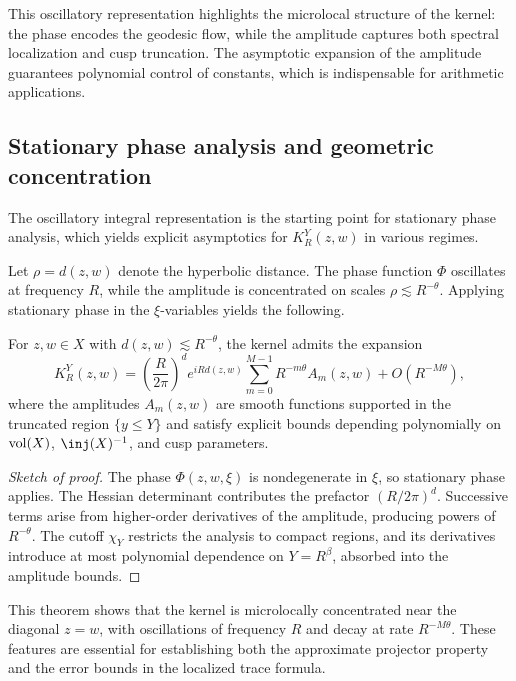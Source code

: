 This oscillatory representation highlights the microlocal structure of the kernel: the phase encodes the geodesic flow, while the amplitude captures both spectral localization and cusp truncation. The asymptotic expansion of the amplitude guarantees polynomial control of constants, which is indispensable for arithmetic applications.

\subsection{Stationary phase analysis and geometric concentration}\label{subsec:micro-stationary}

The oscillatory integral representation is the starting point for stationary phase analysis, which yields explicit asymptotics for $K_R^Y(z,w)$ in various regimes.

Let $\rho = d(z,w)$ denote the hyperbolic distance. The phase function $\Phi$ oscillates at frequency $R$, while the amplitude is concentrated on scales $\rho \lesssim R^{-\theta}$. Applying stationary phase in the $\xi$-variables yields the following.

\begin{theorem}\label{thm:stationary-phase}
For $z,w \in X$ with $d(z,w) \lesssim R^{-\theta}$, the kernel admits the expansion
\[
K_R^Y(z,w) = \left(\frac{R}{2\pi}\right)^d e^{iR d(z,w)} \sum_{m=0}^{M-1} R^{-m\theta} A_m(z,w) + O(R^{-M\theta}),
\]
where the amplitudes $A_m(z,w)$ are smooth functions supported in the truncated region $\{y \leq Y\}$ and satisfy explicit bounds depending polynomially on $\operatorname{vol}(X)$, $\inj(X)^{-1}$, and cusp parameters.
\end{theorem}

\begin{proof}[Sketch of proof]
The phase $\Phi(z,w,\xi)$ is nondegenerate in $\xi$, so stationary phase applies. The Hessian determinant contributes the prefactor $(R/2\pi)^d$. Successive terms arise from higher-order derivatives of the amplitude, producing powers of $R^{-\theta}$. The cutoff $\chi_Y$ restricts the analysis to compact regions, and its derivatives introduce at most polynomial dependence on $Y=R^\beta$, absorbed into the amplitude bounds.
\end{proof}

This theorem shows that the kernel is microlocally concentrated near the diagonal $z=w$, with oscillations of frequency $R$ and decay at rate $R^{-M\theta}$. These features are essential for establishing both the approximate projector property and the error bounds in the localized trace formula.

